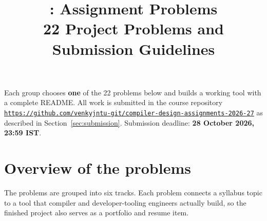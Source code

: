\documentclass[11pt,a4paper]{article}
\title{\textbf{\coursename: Assignment Problems}\\[4pt]\large 22 Project Problems and Submission Guidelines}
\author{}
\date{}
\newcommand{\courserepo}{https://github.com/venkyjntu-git/compiler-design-assignments-2026-27}
\newcommand{\deadline}{28 October 2026, 23:59 IST}
\begin{document}
\maketitle
\thispagestyle{empty}
\vspace{-3em}

\begin{notebox}
Each group chooses \textbf{one} of the 22 problems below and builds a working tool with a complete README.
All work is submitted in the course repository
\href{\courserepo}{\texttt{\courserepo}} as described in Section~\ref{sec:submission}.
Submission deadline: \textbf{\deadline}.
\end{notebox}

\tableofcontents
\newpage

\section{Overview of the problems}

The problems are grouped into six tracks. Each problem connects a syllabus topic to a tool that
compiler and developer-tooling engineers actually build, so the finished project also serves as a
portfolio and resume item. 
\end{document}
